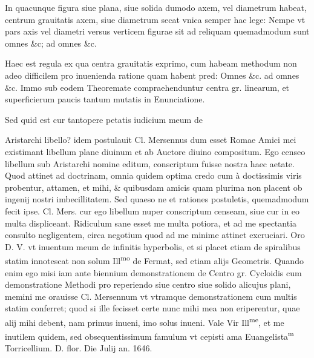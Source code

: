 \documentclass[11pt,a4paper]{article}
\begin{document}
In quacunque figura siue plana, siue solida dumodo axem, vel diametrum habeat, centrum grauitatis axem, siue diametrum secat vnica semper hac lege: Nempe vt pars axis vel diametri versus verticem figurae sit ad reliquam quemadmodum sunt omnes \&c; ad omnes \&c.

Haec est regula ex qua centra grauitatis exprimo, cum habeam methodum non adeo difficilem pro inuenienda ratione quam habent pred: Omnes \&c. ad omnes \&c. Immo sub eodem Theoremate compraehenduntur centra gr. linearum, et superficierum paucis tantum mutatis in Enunciatione.

Sed quid est cur tantopere petatis iudicium meum de


Aristarchi libello? idem postulauit Cl. Mersennus dum esset Romae Amici mei existimant libellum plane diuinum et ab Auctore diuino compositum. Ego censeo libellum sub Aristarchi nomine editum, conscriptum fuisse nostra haec aetate. Quod attinet ad doctrinam, omnia quidem optima credo cum à doctissimis viris probentur, attamen, et mihi, \& quibusdam amicis quam plurima non placent ob ingenij nostri imbecillitatem. Sed quaeso ne et rationes postuletis, quemadmodum fecit ipse. Cl. Mers. cur ego libellum nuper conscriptum censeam, siue cur in eo multa displiceant. Ridiculum sane esset me multa potiora, et ad me spectantia consulto negligentem, circa negotium quod ad me minime attinet excruciari. Oro D. V. vt inuentum meum de infinitis hyperbolis, et si placet etiam de spiralibus statim innotescat non solum Ill\textsuperscript{mo} de Fermat, sed etiam alijs Geometris. Quando enim ego misi iam ante biennium demonstrationem de Centro gr. Cycloidis cum demonstratione Methodi pro reperiendo siue centro siue solido alicujus plani, memini me orauisse Cl. Mersennum vt vtramque demonstrationem cum multis statim conferret; quod si ille fecisset certe nunc mihi mea non eriperentur, quae alij mihi debent, nam primus inueni, imo solus inueni. Vale Vir Ill\textsuperscript{me}, et me inutilem quidem, sed obsequentissimum famulum vt cepisti ama Euangelista\textsuperscript{m} Torricellium. D. flor. Die  Julij an. 1646.
\end{document}
